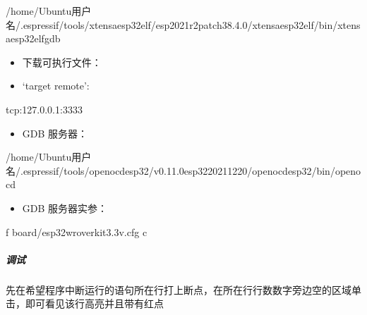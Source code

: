 \documentclass[a4paper,12pt,english]{sphinxmanual}
\begin{document}
{{\begin{itemize}
\end{itemize}

\begin{sphinxVerbatim}[commandchars=\\\{\}]
/home/Ubuntu用户名/.espressif/tools/xtensa\PYGZhy{}esp32\PYGZhy{}elf/esp\PYGZhy{}2021r2\PYGZhy{}patch3\PYGZhy{}8.4.0/xtensa\PYGZhy{}esp32\PYGZhy{}elf/bin/xtensa\PYGZhy{}esp32\PYGZhy{}elf\PYGZhy{}gdb
\end{sphinxVerbatim}
\begin{itemize}
\item {} 
\sphinxAtStartPar
下载可执行文件：

\item {} 
\sphinxAtStartPar
‘target remote’:

\end{itemize}

\begin{sphinxVerbatim}[commandchars=\\\{\}]
tcp:127.0.0.1:3333
\end{sphinxVerbatim}
\begin{itemize}
\item {} 
\sphinxAtStartPar
GDB 服务器：

\end{itemize}

\begin{sphinxVerbatim}[commandchars=\\\{\}]
/home/Ubuntu用户名/.espressif/tools/openocd\PYGZhy{}esp32/v0.11.0\PYGZhy{}esp32\PYGZhy{}20211220/openocd\PYGZhy{}esp32/bin/openocd
\end{sphinxVerbatim}
\begin{itemize}
\item {} 
\sphinxAtStartPar
GDB 服务器实参：

\end{itemize}

\begin{sphinxVerbatim}[commandchars=\\\{\}]
\PYGZhy{}f board/esp32\PYGZhy{}wrover\PYGZhy{}kit\PYGZhy{}3.3v.cfg \PYGZhy{}c 
\end{sphinxVerbatim}

\sphinxAtStartPar
{}


\subparagraph{调试}
\label{\detokenize{exp-esp32/ide/esp-idf-clion-dev:id18}}
\sphinxAtStartPar
先在希望程序中断运行的语句所在行打上断点，在所在行行数数字旁边空的区域单击，即可看见该行高亮并且带有红点

}}
\end{document}

